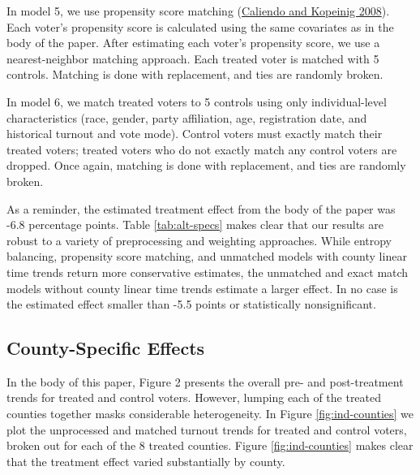 \documentclass[
  12pt,
]{article}
\begin{document}
In model 5, we use propensity score matching (\protect\hyperlink{ref-Caliendo2008}{Caliendo and Kopeinig 2008}). Each voter's propensity score is calculated using the same covariates as in the body of the paper. After estimating each voter's propensity score, we use a nearest-neighbor matching approach. Each treated voter is matched with 5 controls. Matching is done with replacement, and ties are randomly broken.

In model 6, we match treated voters to 5 controls using only individual-level characteristics (race, gender, party affiliation, age, registration date, and historical turnout and vote mode). Control voters must exactly match their treated voters; treated voters who do not exactly match any control voters are dropped. Once again, matching is done with replacement, and ties are randomly broken.

As a reminder, the estimated treatment effect from the body of the paper was -6.8 percentage points. Table \ref{tab:alt-specs} makes clear that our results are robust to a variety of preprocessing and weighting approaches. While entropy balancing, propensity score matching, and unmatched models with county linear time trends return more conservative estimates, the unmatched and exact match models without county linear time trends estimate a larger effect. In no case is the estimated effect smaller than -5.5 points or statistically nonsignificant.

\newpage
\begin{landscape}
\begin{singlespace}

\end{singlespace}
\end{landscape}

\hypertarget{county-specific-effects}{%
\subsection*{County-Specific Effects}\label{county-specific-effects}}

In the body of this paper, Figure 2 presents the overall pre- and post-treatment trends for treated and control voters. However, lumping each of the treated counties together masks considerable heterogeneity. In Figure \ref{fig:ind-counties} we plot the unprocessed and matched turnout trends for treated and control voters, broken out for each of the 8 treated counties. Figure \ref{fig:ind-counties} makes clear that the treatment effect varied substantially by county.
\end{document}
